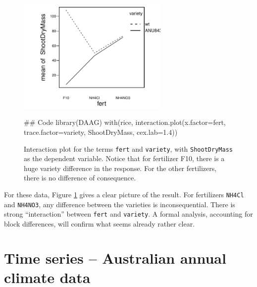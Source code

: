 \documentclass{tufte-book}\usepackage[]{graphicx}\usepackage[]{color}
\newcommand{\txtt}[1]{\texttt{#1}}
\begin{document}
\begin{figure}
\begin{Schunk}


\centerline{\includegraphics[width=0.65\textwidth]{figs/03-do-interact-1} }

\end{Schunk}
    \caption{Interaction plot for the terms \txtt{fert} and
      \txtt{variety}, with \txtt{ShootDryMass} as the dependent
      variable. Notice that for fertilizer F10, there is a huge
      variety difference in the response. For the other fertilizers,
      there is no difference of consequence.\label{fig:rice-interact}}
\begin{Schunk}
\begin{Sinput}
## Code
library(DAAG)
with(rice, interaction.plot(x.factor=fert,
                            trace.factor=variety,
                            ShootDryMass,
                            cex.lab=1.4))
\end{Sinput}
\end{Schunk}
\end{figure}

For these data, 
Figure \ref{fig:rice-interact} gives a clear picture
of the result. For fertilizers \txtt{NH4Cl} and \txtt{NH4NO3}, any
difference between the varieties is inconsequential.   There is
strong ``interaction'' between \txtt{fert} and \txtt{variety}.  A
formal analysis, accounting for block differences, will confirm what
seems already rather clear. 

\section{Time series -- Australian annual climate data}
\end{document}
